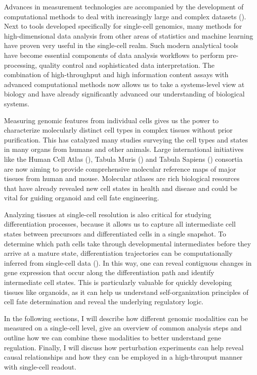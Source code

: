 Advances in measurement technologies are accompanied by the development of computational methods to deal with increasingly large and complex datasets (\cite{zappia_exploring_2018}). Next to tools developed specifically for single-cell genomics, many methods for high-dimensional data analysis from other areas of statistics and machine learning have proven very useful in the single-cell realm. Such modern analytical tools have become essential components of data analysis workflows to perform pre-processing, quality control and sophisticated data interpretation. The combination of high-throughput and high information content assays with advanced computational methods now allows us to take a systems-level view at biology and have already significantly advanced our understanding of biological systems.

Measuring genomic features from individual cells gives us the power to characterize molecularly distinct cell types in complex tissues without prior purification. This has catalyzed many studies surveying the cell types and states in many organs from humans and other animals. Large international initiatives like the Human Cell Atlas (\cite{regev_human_2017}), Tabula Muris (\cite{the_tabula_muris_consortium_single-cell_2020}) and Tabula Sapiens (\cite{the_tabula_sapiens_consortium_tabula_2022}) consortia are now aiming to provide comprehensive molecular reference maps of major tissues from human and mouse. Molecular atlases are rich biological resources that have already revealed new cell states in health and disease and could be vital for guiding organoid and cell fate engineering. 

Analyzing tissues at single-cell resolution is also critical for studying differentiation processes, because it allows us to capture all intermediate cell states between precursors and differentiated cells in a single snapshot. To determine which path cells take through developmental intermediates before they arrive at a mature state, differentiation trajectories can be computationally inferred from single-cell data (\cite{trapnell_dynamics_2014,lange_cellrank_2022}). In this way, one can reveal contiguous changes in gene expression that occur along the differentiation path and identify intermediate cell states. This is particularly valuable for quickly developing tissues like organoids, as it can help us understand self-organization principles of cell fate determination and reveal the underlying regulatory logic. 

In the following sections, I will describe how different genomic modalities can be measured on a single-cell level, give an overview of common analysis steps and outline how we can combine these modalities to better understand gene regulation. Finally, I will discuss how perturbation experiments can help reveal causal relationships and how they can be employed in a high-throuput manner with single-cell readout.


